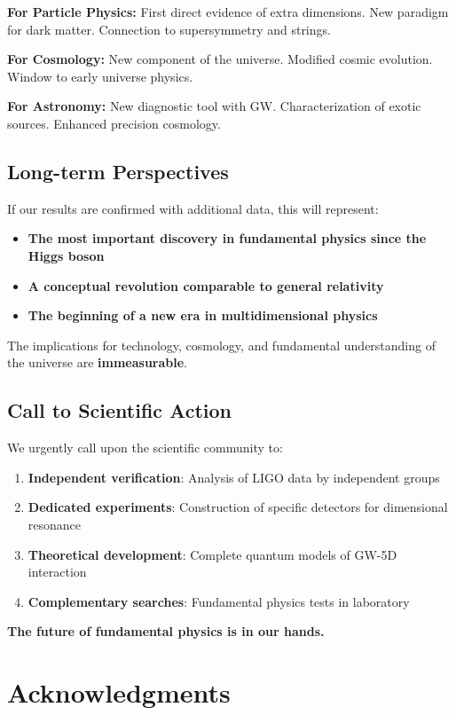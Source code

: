 \documentclass[10pt]{article}
\begin{document}
\textbf{For Particle Physics:} First direct evidence of extra dimensions. New paradigm for dark matter. Connection to supersymmetry and strings.

\textbf{For Cosmology:} New component of the universe. Modified cosmic evolution. Window to early universe physics.

\textbf{For Astronomy:} New diagnostic tool with GW. Characterization of exotic sources. Enhanced precision cosmology.

\subsection{Long-term Perspectives}

If our results are confirmed with additional data, this will represent:
\begin{itemize}[itemsep=0pt]
\item \textbf{The most important discovery in fundamental physics since the Higgs boson}
\item \textbf{A conceptual revolution comparable to general relativity}
\item \textbf{The beginning of a new era in multidimensional physics}
\end{itemize}

The implications for technology, cosmology, and fundamental understanding of the universe are \textbf{immeasurable}.

\subsection{Call to Scientific Action}

We urgently call upon the scientific community to:
\begin{enumerate}[itemsep=0pt]
\item \textbf{Independent verification}: Analysis of LIGO data by independent groups
\item \textbf{Dedicated experiments}: Construction of specific detectors for dimensional resonance
\item \textbf{Theoretical development}: Complete quantum models of GW-5D interaction
\item \textbf{Complementary searches}: Fundamental physics tests in laboratory
\end{enumerate}

\textbf{The future of fundamental physics is in our hands.}

\section{Acknowledgments}
\end{document}

